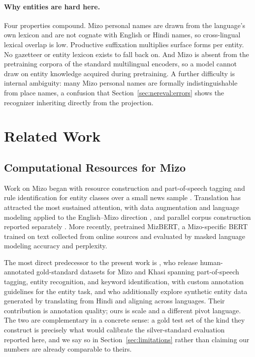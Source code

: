 \documentclass[acmsmall,screen,review]{acmart}
\begin{document}
\paragraph{Why entities are hard here.}
Four properties compound. Mizo personal names are drawn from the language's own
lexicon and are not cognate with English or Hindi names, so cross-lingual
lexical overlap is low. Productive suffixation multiplies surface forms per
entity. No gazetteer or entity lexicon exists to fall back on. And Mizo is
absent from the pretraining corpora of the standard multilingual encoders, so a
model cannot draw on entity knowledge acquired during pretraining. A further
difficulty is internal ambiguity: many Mizo personal names are formally
indistinguishable from place names, a confusion that
Section~\ref{sec:nereval:errors} shows the recognizer inheriting directly from
the projection.

\section{Related Work}
\label{sec:related}

\subsection{Computational Resources for Mizo}
\label{sec:related:mizo}

Work on Mizo began with resource construction and part-of-speech tagging
\citep{pakray2015mizopos} and rule identification for entity classes over a
small news sample \citep{bentham2016mizoner}. Translation has attracted the most
sustained attention, with data augmentation and language modeling applied to the
English--Mizo direction \citep{khenglawt2024mizomt}, and parallel corpus
construction reported separately \citep{dawngliani2023mizocorpus}. More
recently, \citet{lalramhluna2024mizbert} pretrained MizBERT, a Mizo-specific
BERT trained on text collected from online sources and evaluated by masked
language modeling accuracy and perplexity.

The most direct predecessor to the present work is
\citet{ghosh2025mizokhasi}, who release human-annotated gold-standard datasets
for Mizo and Khasi spanning part-of-speech tagging, entity recognition, and
keyword identification, with custom annotation guidelines for the entity task,
and who additionally explore synthetic entity data generated by translating from
Hindi and aligning across languages. Their contribution is annotation quality;
ours is scale and a different pivot language. The two are complementary in a
concrete sense: a gold test set of the kind they construct is precisely what
would calibrate the silver-standard evaluation reported here, and we say so in
Section~\ref{sec:limitations} rather than claiming our numbers are already
comparable to theirs.
\end{document}
